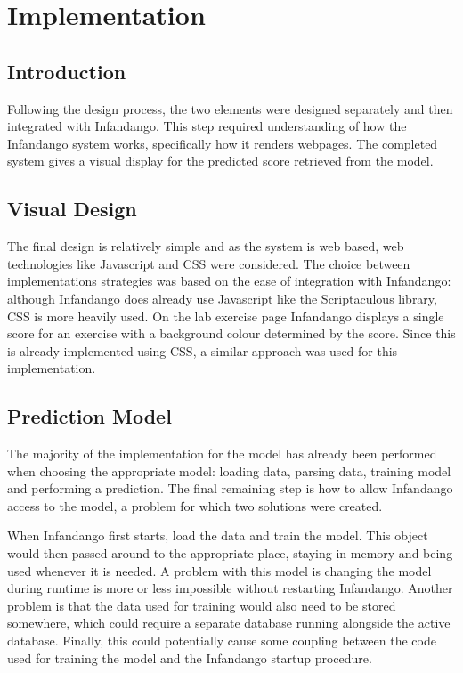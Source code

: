 \chapter{Implementation}
\label{implementation}
\section{Introduction}
Following the design process, the two elements were designed separately and then integrated with Infandango. This step required understanding of how the Infandango system works, specifically how it renders webpages. The completed system gives a visual display for the predicted score retrieved from the model.

\section{Visual Design}
The final design is relatively simple and as the system is web based, web technologies like Javascript and CSS were considered. The choice between implementations strategies was based on the ease of integration with Infandango: although Infandango does already use Javascript like the Scriptaculous library\cite{scriptaculous_cite}, CSS is more heavily used. On the lab exercise page Infandango displays a single score for an exercise with a background colour determined by the score. Since this is already implemented using CSS, a similar approach was used for this implementation.

\section{Prediction Model}
The majority of the implementation for the model has already been performed when choosing the appropriate model: loading data, parsing data, training model and performing a prediction. The final remaining step is how to allow Infandango access to the model, a problem for which two solutions were created. 

When Infandango first starts, load the data and train the model. This object would then passed around to the appropriate place, staying in memory and being used whenever it is needed. A problem with this model is changing the model during runtime is more or less impossible without restarting Infandango. Another problem is that the data used for training would also need to be stored somewhere, which could require a separate database running alongside the active database. Finally, this could potentially cause some coupling between the code used for training the model and the Infandango startup procedure.

